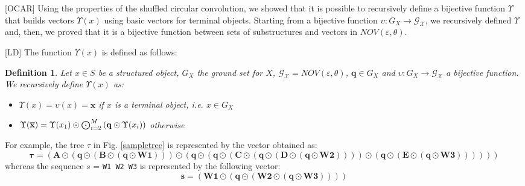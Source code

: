 \documentclass[twoside,11pt]{article}
\newtheorem{definition}{Definition}
\def\vec#1{\mathbf{#1}}
\def\svec#1{\vec{#1}}
\def\substr#1{{\bf\overline{#1}}}
\def\smallvectors#1{\mathcal{#1}}
\def\df{\Upsilon}
\def\basicdf{\upsilon}
\def\mo{\odot}
\def\Mo{\bigodot}
\newcounter{properties}
\def\finalcomment#1#2{}
\def\mysecondremove#1{}
\def\mysecondinsert#1{#1}
\def\LD#1{[{\color{blue}L}D] {\color{blue}#1}}
\def\OCAR#1#2#3#4{[{\color{blue}O}{\color{brown}C}{\color{black}A}{\color{purple}R}] {\color{blue}#1} {\color{brown}#2} {\color{black}#3} {\color{purple}#4}}
\begin{document}

\OCAR{Using the properties of the shuffled circular convolution,}{ we showed that it is possible to recursively define a bijective function $\df$ that builds vectors $\df(x)$ using basic vectors for terminal objects.}{ Starting from a bijective function $\basicdf: G_X \rightarrow \smallvectors{G_X}$, we recursively defined $\df$ and, then, we proved that it is a bijective function between sets of substructures and vectors in $NOV(\varepsilon,\theta)$.}{}


\LD{The function $\df(x)$ is defined as follows:}
\begin{definition}
Let \mysecondremove{$x \in X$}\mysecondinsert{$x \in S$} be a structured object, $G_X$ the ground set for $X$, $\smallvectors{G_X} = NOV(\varepsilon,\theta)$, $\vec q \in G_X$ and $\basicdf: G_X \rightarrow \smallvectors{G_X}$ a bijective function. We recursively define $\df(x)$ as:
\begin{itemize}
\item[] $\df(x) = \basicdf(x) = \svec{x}$ if $x$ is a terminal object, i.e. $x \in G_X$
\item[] $\df(\substr{x}) = \df(x_1) \mo \Mo_{i=2}^M\left(\vec q \mo \df(x_i)\right) $ otherwise 
\end{itemize}
\end{definition}
For example, the tree $\tau$  in Fig. \ref{sampletree}  is represented by the vector obtained as:\\
\begin{displaymath}
\svec{\tau} = (\svec{A} \mo (\vec q \mo (\svec{B} \mo (\vec q \mo \svec{W1}))) \mo (\vec q \mo (\vec q \mo (\svec{C} \mo (\vec q \mo (\svec{D} \mo (\vec q \mo \svec{W2})))) \mo (\vec q \mo (\svec{E} \mo (\vec q \mo \svec{W3}))))))
\end{displaymath}
whereas the sequence $s$ = \texttt{W1 W2 W3} is represented by the following vector:
\begin{displaymath}
\svec{s} = (\svec{W1} \mo (\vec q \mo (\svec{W2} \mo (\vec q \mo \svec{W3}))))
\end{displaymath}
\end{document}
